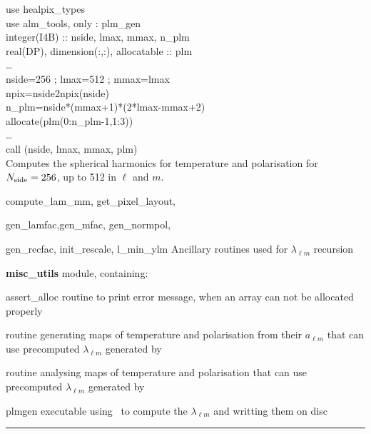 \begin{example}
{
use healpix\_types \\
use alm\_tools, only : plm\_gen \\
integer(I4B) :: nside, lmax, mmax, n\_plm\\
real(DP), dimension(:,:), allocatable :: plm \\
\ldots \\
nside=256 ; lmax=512 ; mmax=lmax\\
npix=nside2npix(nside)\\
n\_plm=nside*(mmax+1)*(2*lmax-mmax+2)\\
allocate(plm(0:n\_plm-1,1:3))\\
\ldots \\
call \thedocid(nside, lmax, mmax, plm)  \\
}
{
Computes the spherical harmonics for temperature and polarisation for $N_\mathrm{side}= 256$, up to 512 in $\ell$ and $m$.
}
\end{example}

\begin{modules}
  \begin{sulist}{} %
  \item[compute\_lam\_mm, get\_pixel\_layout, ]
  \item[gen\_lamfac,gen\_mfac, gen\_normpol, ] 
  \item[gen\_recfac, init\_rescale, l\_min\_ylm] Ancillary routines used
  for $\lambda_{\ell m}$ recursion
  \item[\textbf{misc\_utils}] module, containing:
  \item[assert\_alloc] routine to print error message, when an array can not be
  allocated properly
  \end{sulist}
\end{modules}

\begin{related}
  \begin{sulist}{} %
   \item[\htmlref{alm2map}{sub:alm2map}] routine generating maps of temperature
   and polarisation from their $a_{\ell m}$ that can use precomputed $\lambda_{\ell
   m}$ generated by \thedocid
   \item[\htmlref{map2alm}{sub:map2alm}] routine analysing maps of temperature
   and polarisation that can use precomputed $\lambda_{\ell
   m}$ generated by \thedocid
  \item[plmgen] executable using \thedocid\ to compute the $\lambda_{\ell m}$ and
  writting them on disc 
  \end{sulist}
\end{related}

\rule{\hsize}{2mm}

\newpage

